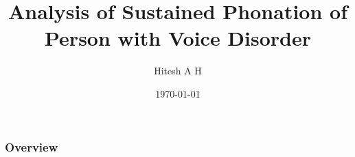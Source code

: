 \documentclass{beamer}
\title[Project Presentation]{Analysis of Sustained Phonation of Person with Voice Disorder} %
\author{Hitesh A H} %
\institute[Government Engineering College, Barton Hill] %
{
\textit{TRV20ECSPXX, Signal Processing} \\\textit{Department of Electronics and Communication Engineering} \\ %
\medskip
}
\date{\today} %
\begin{document}
\begin{frame}
\titlepage %
\end{frame}

\begin{frame}
\frametitle{Overview} %
\tableofcontents %
\end{frame}


\end{document}
